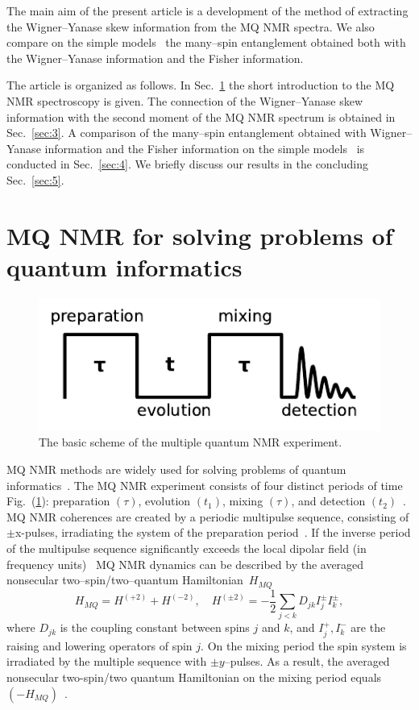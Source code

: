 \documentclass[preprint,12pt]{elsarticle}
\begin{document}
The main aim of the present article is a development of the method of extracting the Wigner--Yanase skew information from the MQ NMR spectra.
We also compare on the simple models~\cite{7,15} the many--spin entanglement obtained both with the Wigner--Yanase information and the Fisher information.


The article is organized as follows.
In Sec.~\ref{sec:2} the short introduction to the MQ NMR spectroscopy is given.
The connection of the Wigner--Yanase skew information with the second moment of the MQ NMR spectrum is obtained in Sec.~\ref{sec:3}.
A comparison of the many--spin entanglement obtained with Wigner--Yanase information and the Fisher information on the simple models~\cite{7,15} is conducted in Sec.~\ref{sec:4}.
We briefly discuss our results in the concluding Sec.~\ref{sec:5}.


\section{MQ NMR for solving problems of quantum informatics}
\label{sec:2}


\begin{figure}
	\includegraphics[width=0.95\linewidth]{mq-experiment}
	\caption{The basic scheme of the multiple quantum NMR experiment.}
	\label{fig:1}
\end{figure}

MQ NMR methods are widely used for solving problems of quantum informatics~\cite{16,17}. The MQ NMR experiment consists of four distinct periods of time Fig.~(\ref{fig:1}): preparation $(\tau)$, evolution $(t_1)$, mixing $(\tau)$, and detection $(t_2)$~\cite{9}.
MQ NMR coherences are created by a periodic multipulse sequence, consisting of
$\pm$x-pulses, irradiating the system of the preparation period~\cite{9}.
If the inverse period of the multipulse sequence significantly exceeds the local dipolar field (in frequency units)~\cite{18}
MQ NMR dynamics can be described by the averaged nonsecular two--spin/two--quantum Hamiltonian~$H_{MQ}$~\cite{19}
%
\begin{equation} \label{eq:1}
        H_{MQ} = H^{(+2)} + H^{(-2)} , \quad
        H^{(\pm 2)} = -\frac{1}{2} \sum_{j<k} D_{jk} I_{j} ^\pm I_k^\pm,
\end{equation}
%
where $D_{jk}$ is the coupling constant between spins $j$ and $k$,
and $I_{j}^+, I_k ^-$ are the raising and lowering operators of spin $j$.
On the mixing period the spin system is irradiated by the multiple sequence with $\pm y$--pulses.
As a result, the averaged nonsecular two-spin/two quantum Hamiltonian on the mixing period equals $(-H_{MQ})$~\cite{9}.
\end{document}
